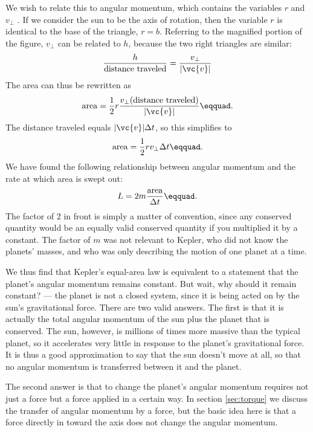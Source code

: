 We wish to relate this to angular momentum, which contains
the variables $r$ and $v_{\perp}$ . If we consider the sun to be the
axis of rotation, then the variable $r$ is identical to the
base of the triangle, $r=b$. Referring to the magnified
portion of the figure, $v_{\perp}$ can be related to $h$, because
the two right triangles are similar:
\begin{equation*}
  \frac{h}{\text{distance traveled}} = \frac{v_\perp}{|\vc{v}|}
\end{equation*}
The area can thus be rewritten as
\begin{equation*}
                \text{area}         =    \frac{1}{2}r\frac{v_\perp(\text{distance traveled})}{|\vc{v}|}\eqquad.
\end{equation*}
The distance traveled equals $|\vc{v}|\Delta t$, so this simplifies to
\begin{equation*}
                \text{area}         =   \frac{1}{2}rv_\perp \Delta t\eqquad.
\end{equation*}
We have found the following relationship between angular
momentum and the rate at which area is swept out:
\begin{equation*}
                L         =     2m\frac{\text{area}}{\Delta t}\eqquad.
\end{equation*}
The factor of 2 in front is simply a matter of convention,
since any conserved quantity would be an equally valid
conserved quantity if you multiplied it by a constant. The
factor of $m$ was not relevant to Kepler, who did not know
the planets' masses, and who was only describing the motion
of one planet at a time.

We thus find that Kepler's equal-area law is equivalent to a
statement that the planet's angular momentum remains
constant. But wait, why should it remain constant? --- the
planet is not a closed system, since it is being acted on by
the sun's gravitational force. There are two valid answers.
The first is that it is actually the total angular momentum
of the sun plus the planet that is conserved. The sun,
however, is millions of times more massive than the typical
planet, so it accelerates very little in response to the
planet's gravitational force. It is thus a good approximation
to say that the sun doesn't move at all, so that no angular
momentum is transferred between it and the planet.

The second answer is that to change the planet's angular
momentum requires not just a force but a force applied in a
certain way. In section \ref{sec:torque} we discuss the transfer of
angular momentum by a force, but the basic idea here is that
a force directly in toward the axis does not change
the angular momentum.

